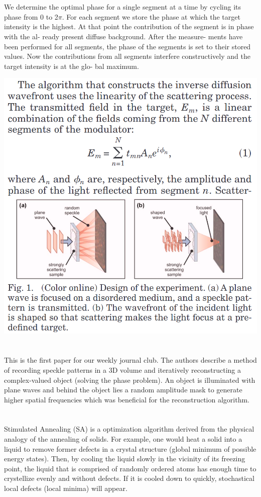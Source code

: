 \documentclass{article}
\begin{document}
\section{\cite{Vellekoop2007-ke} }

We determine the optimal phase for a
single segment at a time by cycling its phase from 0 to 2$\pi$. For each segment we store the phase at which the target intensity is the highest. At that point the contribution of the segment is in phase with the al- ready present diffuse background. After the measure- ments have been performed for all segments, the phase of the segments is set to their stored values. Now the contributions from all segments interfere constructively and the target intensity is at the glo- bal maximum.

\includegraphics[width=.8\textwidth]{figures/FL.png}


\section{\cite{Anand2010-ji} }
This is the first paper for our weekly journal club.
The authors describe a method of recording speckle patterns in a 3D volume and iteratively reconstructing a complex-valued object (solving the phase problem). An object is illuminated with plane waves and behind the object lies a random amplitude mask to generate higher spatial frequencies which was beneficial for the reconstruction algorithm.

\section{\cite{Eglese1990-dv} }
Stimulated Annealing (SA) is a optimization algorithm derived from the physical analogy of the annealing of solids. For example, one would heat a solid into a liquid to remove former defects in a crystal structure (global minimum of possible energy states). Then, by cooling the liquid slowly in the vicinity of its freezing point, the liquid that is comprised of randomly ordered atoms has enough time to crystellize evenly and without defects. If it is cooled down to quickly, stochastical local defects (local minima) will appear.
\end{document}
